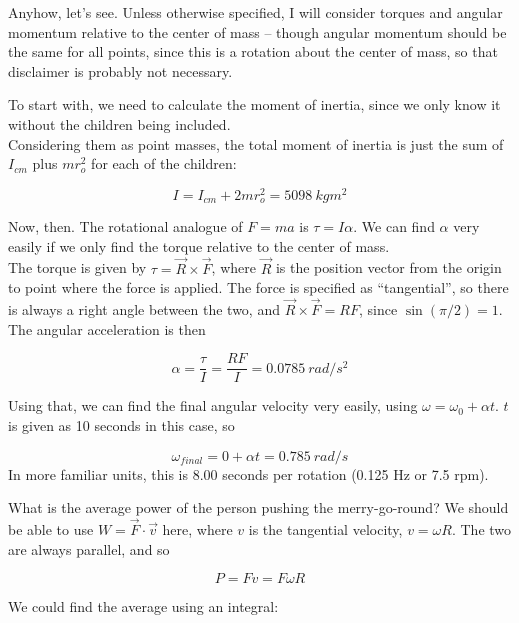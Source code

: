 \documentclass[12pt,a4paper]{report}
\begin{document}
Anyhow, let's see. Unless otherwise specified, I will consider torques and angular momentum relative to the center of mass -- though angular momentum should be the same for all points, since this is a rotation about the center of mass, so that disclaimer is probably not necessary.

To start with, we need to calculate the moment of inertia, since we only know it without the children being included.\\
Considering them as point masses, the total moment of inertia is just the sum of $I_{cm}$ plus $m r_o^2$ for each of the children:

\begin{equation}
I = I_{cm} + 2 m r_o^2 = \SI{5098}{kg m^2}
\end{equation}

Now, then. The rotational analogue of $F = m a$ is $\tau = I \alpha$. We can find $\alpha$ very easily if we only find the torque relative to the center of mass.\\
The torque is given by $\tau = \vec{R} \times \vec{F}$, where $\vec{R}$ is the position vector from the origin to point where the force is applied. The force is specified as ``tangential'', so there is always a right angle between the two, and $\vec{R} \times \vec{F} = R F$, since $\sin(\pi/2) = 1$. The angular acceleration is then

\begin{equation}
\alpha = \frac{\tau}{I} = \frac{R F}{I} = \SI{0.0785}{rad/s^2}
\end{equation}

Using that, we can find the final angular velocity very easily, using $\omega = \omega_0 + \alpha t$. $t$ is given as 10 seconds in this case, so

\begin{equation}
\omega_{final} = 0 + \alpha t = \SI{0.785}{rad/s}
\end{equation}
In more familiar units, this is 8.00 seconds per rotation (0.125 Hz or 7.5 rpm).

What is the average power of the person pushing the merry-go-round? We should be able to use $W = \vec{F} \cdot \vec{v}$ here, where $v$ is the tangential velocity, $v = \omega R$. The two are always parallel, and so

\begin{equation}
P = F v = F \omega R
\end{equation}

We could find the average using an integral: 
\end{document}
